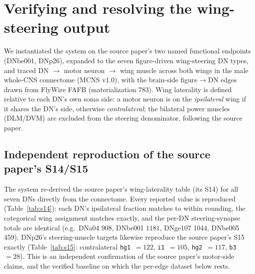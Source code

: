 \documentclass[11pt]{article}
\newcommand{\ttt}[1]{\texttt{\small #1}}
\begin{document}
\section{Verifying and resolving the wing-steering output}

We instantiated the system on the source paper's two named functional endpoints (DNbe001, DNp26),
expanded to the seven figure-driven wing-steering DN types, and traced
DN $\rightarrow$ motor neuron $\rightarrow$ wing muscle across both wings in the male whole-CNS
connectome (MCNS v1.0), with the brain-side figure$\rightarrow$DN edges drawn from FlyWire FAFB
(materialization 783). Wing laterality is defined relative to each DN's own soma side: a motor neuron
is on the \emph{ipsilateral} wing if it shares the DN's side, otherwise \emph{contralateral}; the
bilateral power muscles (DLM/DVM) are excluded from the steering denominator, following the source paper.

\subsection{Independent reproduction of the source paper's S14/S15}

The system re-derived the source paper's wing-laterality table (its S14) for all seven DNs directly
from the connectome. Every reported value is reproduced (Table~\ref{tab:s14}): each DN's ipsilateral
fraction matches to within rounding, the categorical wing assignment matches exactly, and the per-DN
steering-synapse totals are identical (e.g.\ DNa04 $908$, DNbe001 $1181$, DNge107 $1044$, DNbe005
$459$). DNp26's steering-muscle targets likewise reproduce the source paper's S15 exactly
(Table~\ref{tab:s15}: contralateral \ttt{hg1}~$=122$, \ttt{i1}~$=105$, \ttt{hg2}~$=117$, \ttt{b3}~$=28$).
This is an independent confirmation of the source paper's motor-side claims, and the verified baseline
on which the per-edge dataset below rests.
\end{document}

